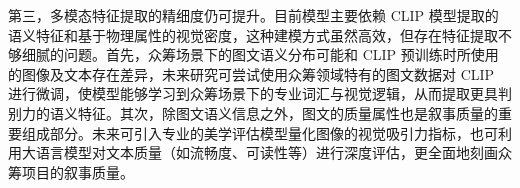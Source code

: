 第三，多模态特征提取的精细度仍可提升。目前模型主要依赖 CLIP 模型提取的语义特征和基于物理属性的视觉密度，这种建模方式虽然高效，但存在特征提取不够细腻的问题。首先，众筹场景下的图文语义分布可能和 CLIP 预训练时所使用的图像及文本存在差异，未来研究可尝试使用众筹领域特有的图文数据对 CLIP 进行微调，使模型能够学习到众筹场景下的专业词汇与视觉逻辑，从而提取更具判别力的语义特征。其次，除图文语义信息之外，图文的质量属性也是叙事质量的重要组成部分。未来可引入专业的美学评估模型量化图像的视觉吸引力指标，也可利用大语言模型对文本质量（如流畅度、可读性等）进行深度评估，更全面地刻画众筹项目的叙事质量。

